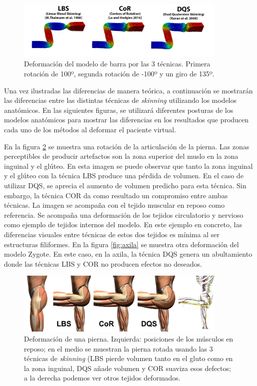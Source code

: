 \begin{figure}[h]%
  \centering
  \includegraphics[width=0.90\textwidth]{IMG/BarraCoR}
    \caption{Deformación del modelo de barra por las 3 técnicas. Primera rotación de 100º, segunda rotación de -100º y un giro de 135º.}
    \label{fig:bar_bending}
\end{figure}

Una vez ilustradas las diferencias de manera teórica, a continuación se mostrarán las diferencias entre las distintas técnicas de \emph{skinning} utilizando los modelos anatómicos. En las siguientes figuras, se utilizará diferentes posturas de los modelos anatómicos para mostrar las diferencias en los resultados que producen cada uno de los métodos al deformar el paciente virtual.

En la figura \ref{fig:thigh_bending} se muestra una rotación de la articulación de la pierna. Las zonas perceptibles de producir artefactos son la zona superior del muslo en la zona inguinal y el glúteo. En esta imagen se puede observar que tanto la zona inguinal y el glúteo con la técnica \ac{LBS} produce una pérdida de volumen. En el caso de utilizar \ac{DQS}, se aprecia el aumento de volumen predicho para esta técnica. Sin embargo, la técnica \ac{COR} da como resultado un compromiso entre ambas técnicas. La imagen se acompaña con el tejido muscular en reposo como referencia. Se acompaña una deformación de los tejidos circulatorio y nervioso como ejemplo de tejidos internos del modelo. En este ejemplo en concreto, las diferencias visuales entre técnicas de estos dos tejidos es mínima al ser estructuras filiformes. En la figura \ref{fig:axila} se muestra otra deformación del modelo Zygote. En este caso, en la axila, la técnica \ac{DQS} genera un abultamiento donde las técnicas \ac{LBS} y \ac{COR} no producen efectos no deseados.



\begin{figure}[h]%
  \centering
  \includegraphics[width=0.90\textwidth]{IMG/compculo}
    \caption{ Deformación de una pierna. Izquierda: posiciones de los músculos en reposo; en el medio se muestran la pierna rotada usando las 3 técnicas de \emph{skinning} (\ac{LBS} pierde volumen tanto en el gluto como en la zona inguinal, \ac{DQS} añade volumen y \ac{COR} suaviza esos defectos; a la derecha podemos ver otros tejidos deformados.}
    \label{fig:thigh_bending}
\end{figure}

